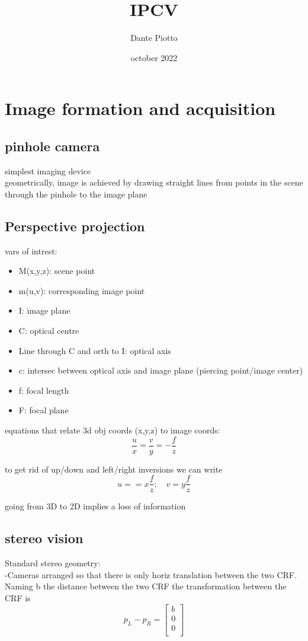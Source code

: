 \documentclass{article}
\title{IPCV}
\author{Dante Piotto}
\date{october 2022}
\begin{document}
\section{Image formation and acquisition}

\subsection{pinhole camera}
simplest imaging device\\
geometrically, image is achieved by drawing straight lines from points in the scene through the pinhole to the image plane

\subsection{Perspective projection}
vars of intrest:
\begin{itemize}
	\item M(x,y,z): scene point
	\item m(u,v): corresponding image point
	\item I: image plane
	\item C: optical centre
	\item Line through C and orth to I: optical axis
	\item c: intersec between optical axis and image plane (piercing point/image center)
	\item f: focal length
	\item F: focal plane
\end{itemize}

equations that relate 3d obj coords (x,y,z) to image coords:
\begin{equation}
	\frac{u}{x} = \frac{v}{y}=- \frac{f}{z}
\end{equation}

to get rid of up/down and left/right inversions we can write
\begin{equation}
		u= = x \frac{f}{z}; \quad v=y \frac{f}{z}
\end{equation}

going from 3D to 2D implies a loss of information

\subsection{stereo vision}

Standard stereo geometry:\\
-Cameras arranged so that there is only horiz translation between the two CRF. Naming b the distance between the two CRF the transformation between the CRF is
\begin{equation}
	p_L-p_R = \begin{bmatrix}
	b\\
	0\\
	0\\
	\end{bmatrix}
\end{equation}
\end{document}
